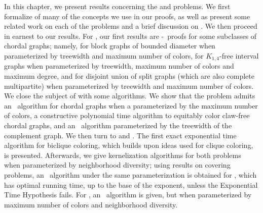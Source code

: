 In this chapter, we present results concerning the  and  problems.
We first formalize of many of the concepts we use in our proofs, as well as present some related work on each of the problems and a brief discussion on .
We then proceed in earnest to our results.
For , our first results are \W[1]-\Hness\ proofs for some subclasses of chordal graphs; namely, for block graphs of bounded diameter when parameterized by treewidth and maximum number of colors, for $K_{1,4}$-free interval graphs when parameterized by treewidth, maximum number of colors and maximum degree, and for disjoint union of split graphs (which are also complete multipartite) when parameterized by treewidth and maximum number of colors.
We close the subject of  with some algorithms.
We show that the problem admits an \XP\ algorithm for chordal graphs when a parameterized by the maximum number of colors, a constructive polynomial time algorithm to equitably color claw-free chordal graphs, and an \FPT\ algorithm parameterized by the treewidth of the complement graph.
We then turn to  and .
The first exact exponential time algorithm for biclique coloring, which builds upon ideas used for clique coloring, is presented.
Afterwards, we give kernelization algorithms for both problems when parameterized by neighborhood diversity; using results on covering problems, an \FPT\ algorithm under the same parameterization is obtained for , which has optimal running time, up to the base of the exponent, unless the Exponential Time Hypothesis fails.
For , an \FPT\ algorithm is given, but when parameterized by maximum number of colors and neighborhood diversity.









